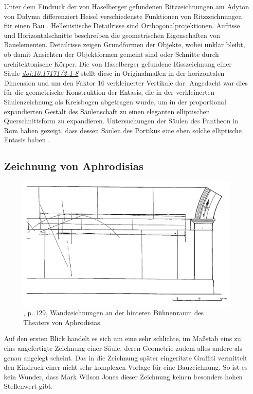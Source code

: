 \documentclass[twocolumn]{bmcart}
\begin{document}
Unter dem Eindruck der von Haselberger gefundenen Ritzzeichnungen  am  Adyton von Didyma differenziert Heisel verschiedenste Funktionen von Ritzzeichnungen für einen Bau \cite{heisel1993}. Hellenistische Detailrisse sind  Orthogonalprojektionen. Aufrisse und Horizontalschnitte beschreiben die geometrischen Eigenschaften von Bauelementen. Detailrisse zeigen Grundformen der Objekte, wobei unklar bleibt, ob damit Ansichten der Objektformen gemeint sind oder Schnitte durch architektonische Körper. Die von Haselberger gefundene  Risszeichnung einer Säule \href{http://dx.doi.org/10.17171/2-1-8}{\textit{doi:10.17171/2-1-8}} stellt diese in Originalmaßen in der horizontalen Dimension und um den Faktor 16 verkleinerter Vertikale dar. Angedacht war dies für die geometrische Konstruktion der Entasis, die in der verkleinerten Säulenzeichnung als Kreisbogen abgetragen wurde, um in der proportional expandierten Gestalt des Säulenschaft zu einen eleganten elliptischen Querschnittsform zu expandieren. Untersuchungen der Säulen des Pantheon in Rom haben gezeigt, dass dessen Säulen des Portikus eine eben solche elliptische Entasis haben \cite{grasshoffdecoding2013}.

\subsection{Zeichnung von Aphrodisias}

\begin{figure}
	\centering
	\includegraphics[width=1\linewidth]{figures/screenshot002}
	\caption{\cite{jonesmarkwilson2000}, p. 129, Wandzeichnungen an der hinteren Bühnenraum des Theaters von Aphrodisias.}
	\label{fig:screenshot002}
\end{figure}

Auf den ersten Blick handelt es sich um eine sehr schlichte, im Maßstab eins zu eins angefertigte Zeichnung einer Säule, deren Geometrie zudem alles andere als genau angelegt scheint. Das in die Zeichnung später eingeritzte Graffiti vermittelt den Eindruck einer nicht sehr komplexen Vorlage für eine Bauzeichnung. So ist es kein Wunder, dass Mark Wilson Jones dieser Zeichnung keinen besonders hohen Stellenwert gibt.
\end{document}
